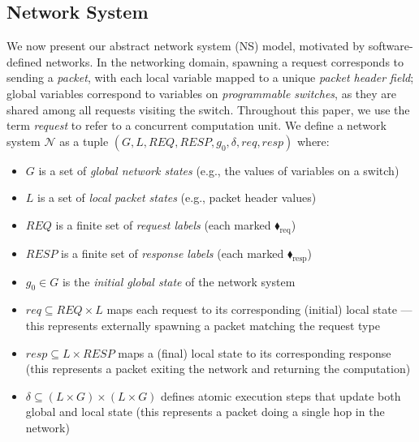 \subsection{Network System}    
We now present our abstract network system (NS) model, motivated by software-defined networks. In the networking domain, spawning a request corresponds to sending a \textit{packet}, with each local variable mapped to a unique \textit{packet header field}; global variables correspond to variables on \textit{programmable switches}, as they are shared among all requests visiting the switch. Throughout this paper, we use the term \emph{request} to refer to a concurrent computation unit. 
%
We define a network system $\mathcal{N}$ as a tuple $(G, L, \mathit{REQ},  \mathit{RESP}, g_0, \delta, \mathit{req}, \mathit{resp})$ where:
\begin{itemize}
\item $G$ is a set of \textit{global network states} (e.g., the values of variables on a switch)

\item $L$ is a set of \textit{local packet states} (e.g., packet header values)

\item $\mathit{REQ}$ is a finite set of \textit{request labels} (each marked {\color{ForestGreen}$\blacklozenge_\text{req}$})

\item $\mathit{RESP}$ is a finite set of \textit{response labels} (each marked {\color{red}$\blacklozenge_\text{resp}$})

\item $g_0 \in G$ is the \textit{initial global state} of the network system

\item $\mathit{req} \subseteq \mathit{REQ} \times  L$ maps each request to its corresponding (initial) local state --- this represents externally spawning a packet matching the request type

\item $\mathit{resp} \subseteq L \times \mathit{RESP}$ maps a (final) local state to its corresponding response (this represents a packet exiting the network and returning the computation)

\item $\delta \subseteq  (L \times G) \times ( L \times G)$ defines atomic execution steps that update both global and local state (this represents a packet doing a single hop in the network)
\end{itemize}

